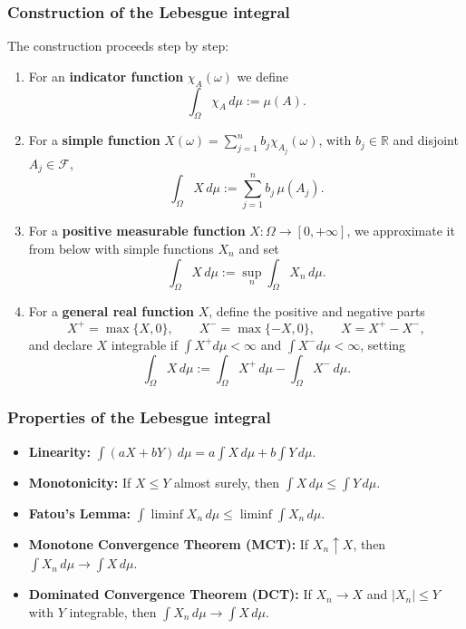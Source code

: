\documentclass[12pt,a4paper]{book}
\theoremstyle{remark}
\begin{document}
\subsubsection*{Construction of the Lebesgue integral}
The construction proceeds step by step:
\begin{enumerate}[label=\roman*)]
    \item For an \textbf{indicator function} $\chi_A(\omega)$ we define
    \[
    \int_\Omega \chi_A \, d\mu := \mu(A).
    \]
    \item For a \textbf{simple function} $X(\omega)=\sum_{j=1}^n b_j \chi_{A_j}(\omega)$, with $b_j \in \mathbb{R}$ and disjoint $A_j\in\mathcal{F}$,
    \[
    \int_\Omega X\,d\mu := \sum_{j=1}^n b_j \,\mu(A_j).
    \]
    \item For a \textbf{positive measurable function} $X:\Omega\to [0,+\infty]$, we approximate it from below with simple functions $X_n$ and set
    \[
    \int_\Omega X\,d\mu := \sup_n \int_\Omega X_n\,d\mu.
    \]
    \item For a \textbf{general real function} $X$, define the positive and negative parts
    \[
    X^+ = \max\{X,0\}, \qquad X^- = \max\{-X,0\}, \qquad X=X^+-X^-,
    \]
    and declare $X$ integrable if $\int X^+ d\mu < \infty$ and $\int X^- d\mu < \infty$, setting
    \[
    \int_\Omega X\,d\mu := \int_\Omega X^+\,d\mu - \int_\Omega X^-\,d\mu.
    \]
\end{enumerate}

\subsubsection*{Properties of the Lebesgue integral}
\begin{itemize}
    \item \textbf{Linearity:} $\int (aX+bY)\,d\mu = a\int X\,d\mu + b\int Y\,d\mu$.
    \item \textbf{Monotonicity:} If $X\leq Y$ almost surely, then $\int X\,d\mu \leq \int Y\,d\mu$.
    \item \textbf{Fatou’s Lemma:} $\int \liminf X_n \,d\mu \leq \liminf \int X_n \,d\mu$.
    \item \textbf{Monotone Convergence Theorem (MCT):} If $X_n\uparrow X$, then $\int X_n\,d\mu \to \int X\,d\mu$.
    \item \textbf{Dominated Convergence Theorem (DCT):} If $X_n\to X$ and $|X_n|\leq Y$ with $Y$ integrable, then $\int X_n\,d\mu \to \int X\,d\mu$.
\end{itemize}
\end{document}
